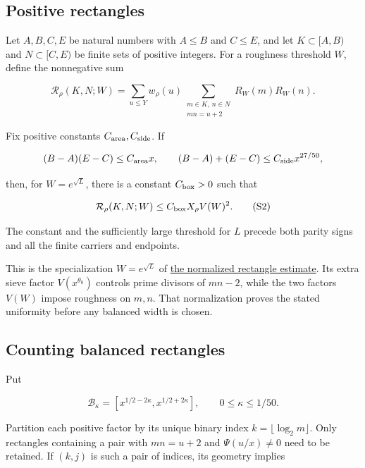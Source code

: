 
\hypertarget{sieve-positive-rectangles}{%
\subsection{Positive rectangles}\label{sieve-positive-rectangles}}

Let \(A,B,C,E\) be natural numbers with \(A\le B\) and \(C\le E\), and
let \(K\subset[A,B)\) and \(N\subset[C,E)\) be finite sets of positive
integers. For a roughness threshold \(W\), define the nonnegative sum

\[
\mathcal R_\rho(K,N;W)
=\sum_{u\le Y}w_\rho(u)
  \sum_{\substack{m\in K,\ n\in N\\mn=u+2}}
    R_W(m)R_W(n).
\]

Fix positive constants \(C_{\rm area},C_{\rm side}\). If

\[
(B-A)(E-C)\le C_{\rm area}x,
\qquad (B-A)+(E-C)\le C_{\rm side}x^{27/50},
\]

then, for \(W=e^{\sqrt L}\), there is a constant \(C_{\rm box}>0\) such
that

\[
\mathcal R_\rho(K,N;W)\le C_{\rm box}X_\rho V(W)^2. \tag{S2}
\]

The constant and the sufficiently large threshold for \(L\) precede both
parity signs and all the finite carriers and endpoints.

This is the specialization \(W=e^{\sqrt L}\) of
\protect\hyperlink{rectangles-normalization-by-the-actual-mass}{the
normalized rectangle estimate}. Its extra sieve factor
\(V(x^{\theta_0})\) controls prime divisors of \(mn-2\), while the two
factors \(V(W)\) impose roughness on \(m,n\). That normalization proves
the stated uniformity before any balanced width is chosen.


\hypertarget{sieve-counting-balanced-rectangles}{%
\subsection{Counting balanced
rectangles}\label{sieve-counting-balanced-rectangles}}

Put

\[
\mathcal B_\kappa=[x^{1/2-2\kappa},x^{1/2+2\kappa}],
\qquad0\le\kappa\le1/50.
\]

Partition each positive factor by its unique binary index
\(k=\lfloor\log_2m\rfloor\). Only rectangles containing a pair with
\(mn=u+2\) and \(\Psi(u/x)\ne0\) need to be retained. If \((k,j)\) is
such a pair of indices, its geometry implies

